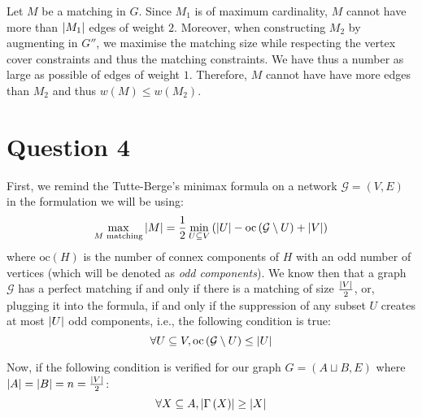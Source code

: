 \documentclass[math]{cours}
\def\oc{\mathrm{oc}}
\begin{document}
Let $M$ be a matching in $G$.
Since $M_{1}$ is of maximum cardinality, $M$ cannot have more than $\left|M_{1}\right|$ edges of weight $2$.
Moreover, when constructing $M_{2}$ by augmenting in $G''$, we maximise the matching size while respecting the vertex cover constraints and thus the matching constraints.
We have thus a number as large as possible of edges of weight $1$.
Therefore, $M$ cannot have have more edges than $M_{2}$ and thus $w(M) \leq w(M_{2})$.

\section{Question 4}
First, we remind the Tutte-Berge's minimax formula on a network $\mathcal{G} = \left(V, E\right)$ in the formulation we will be using:
\begin{equation}
	\max_{M \text{ matching}} \abs{M} = \frac{1}{2}\min_{U \subseteq V} \left(\abs{U} - \oc\left(\mathcal{G} \setminus U\right) + \abs{V} \right)
\end{equation}
where $\oc(H)$ is the number of connex components of $H$ with an odd number of vertices (which will be denoted as \emph{odd components}).
We know then that a graph $\mathcal{G}$ has a perfect matching if and only if there is a matching of size $\frac{\left|V\right|}{2}$, or, plugging it into the formula, if and only if the suppression of any subset $U$ creates at most $\left|U\right|$ odd components, i.e., the following condition is true:
\begin{equation}
	\label{eq:tuttecondition}
	\forall U \subseteq V, \oc\left(\mathcal{G} \setminus U\right) \leq \abs{U}
\end{equation}

Now, if the following condition is verified for our graph $G = \left(A\sqcup B, E\right)$ where $\left|A\right| = \left|B\right| = n = \frac{\left|V\right|}{2}$:
\begin{equation}
	\forall X \subseteq A, \left|\Gamma\left(X\right)\right| \geq \left|X\right|
	\label{eq:hallcondition}
\end{equation}
\end{document}
